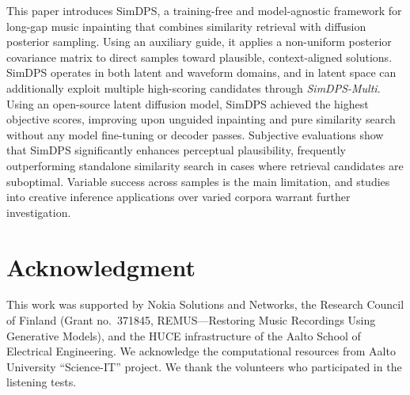\documentclass{article}
\begin{document}
This paper introduces SimDPS, a training-free and model-agnostic framework for long-gap music inpainting that combines similarity retrieval with diffusion posterior sampling. 
Using an auxiliary guide, it applies a non-uniform posterior covariance matrix to direct samples toward plausible, context-aligned solutions. 
SimDPS operates in both latent and waveform domains, and in latent space can additionally exploit multiple high-scoring candidates through \textit{SimDPS-Multi}. 
Using an open-source latent diffusion model, SimDPS achieved the highest objective scores, improving upon unguided inpainting and pure similarity search without any model fine-tuning or decoder passes.
Subjective evaluations show that SimDPS significantly enhances perceptual plausibility, frequently outperforming standalone similarity
search in cases where retrieval candidates are suboptimal.
Variable success across samples is the main limitation, and studies into creative inference applications over varied corpora warrant further investigation.




\newpage

\section{Acknowledgment}
This work was supported by Nokia Solutions and Networks, the Research Council of Finland (Grant no.~371845, REMUS---Restoring Music Recordings Using Generative Models), and the HUCE infrastructure of the Aalto School of Electrical Engineering. We acknowledge the computational resources from Aalto University “Science-IT” project. 
We thank the volunteers who participated in the listening tests.
\end{document}
